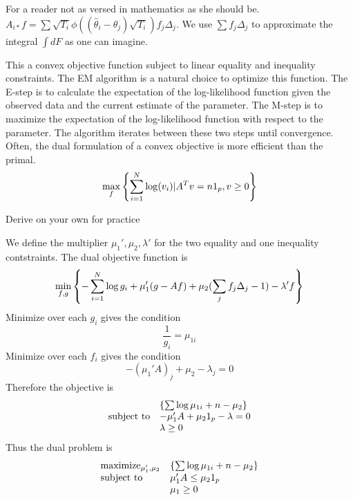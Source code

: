 \begin{remark}
    For a reader not as versed in mathematics as she should be. $A_{i*}f = \sum \sqrt{T_i}\phi((\hat{\theta}_i-\theta_j)\sqrt{T_i})f_j\Delta_j$.
    We use $\sum f_j\Delta_j$ to approximate the integral $\int dF$ as one can imagine.
\end{remark}
This a convex objective function subject to linear equality  and inequality constraints. The EM algorithm is a natural choice to optimize this function. The E-step is to calculate the expectation of the log-likelihood function given the observed data and the current estimate of the parameter. The M-step is to maximize the expectation of the log-likelihood function with respect to the parameter. The algorithm iterates between these two steps until convergence.
Often, the dual formulation of a convex objective is more efficient than the primal.
\begin{equation*}
    \max_f \left\{ \sum_{i=1}^N\log (v_i)|A^T v = n 1_p, v\ge 0\right\}
\end{equation*}
\begin{question}
    Derive on your own for practice
\end{question}
\begin{sol}
    We define the multiplier $\mu_1', \mu_2, \lambda'$ for the two equality and one inequality contstraints.
    The dual objective function is \begin{equation*}
        \min_{f,g} \left\{-\sum_{i=1}^N\log g_i + \mu_1'(g-Af) + \mu_2(\sum_j f_j\Delta_j-1) - \lambda' f\right\}
    \end{equation*}
    Minimize over each $g_i$ gives the condition \begin{equation*}
        \frac{1}{g_i}=\mu_{1i}
    \end{equation*}
    Minimize over each $f_i$ gives the condition \begin{equation*}
        -(\mu_1'A)_j+\mu_2-\lambda_j=0
    \end{equation*}
    Therefore the objective is \begin{equation*}
        \begin{array}{ll}
                              & \left\{\sum \log \mu_{1i} + n - \mu_2 \right\} \\
            \text{subject to} & -\mu_1'A+\mu_2 1_p-\lambda=0          \\
                              & \lambda\ge 0
        \end{array}
    \end{equation*} Thus the dual problem is \begin{equation*}
        \begin{array}{ll}
            \text{maximize}_{\mu_1',\mu_2} & \left\{\sum \log \mu_{1i}+n-\mu_2\right\} \\
            \text{subject to}              & \mu_1'A\le \mu_2 1_p             \\
                                           & \mu_1\ge 0
        \end{array}
    \end{equation*}
\end{sol}
